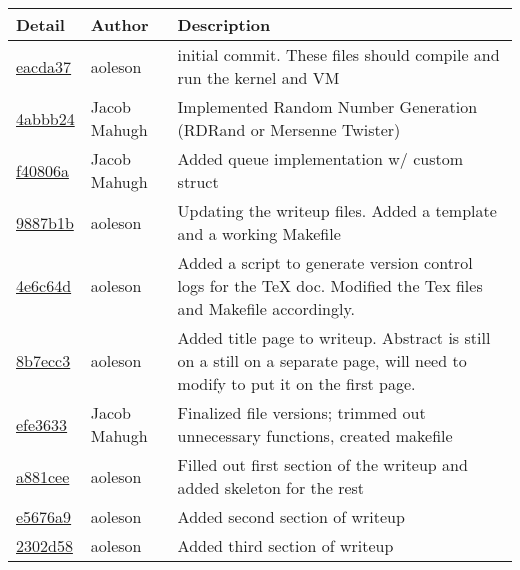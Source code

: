 \begin{tabular}{l l l}\textbf{Detail} & \textbf{Author} & \textbf{Description}\\\hline
\href{git@github.com:aoleson/cs444/commit/eacda375043af0c890654149a289a781c0d558cf}{eacda37} & aoleson & initial commit. These files should compile and run the kernel and VM\\\hline
\href{git@github.com:aoleson/cs444/commit/4abbb240a90bdba422c608f9917f45b501decaac}{4abbb24} & Jacob Mahugh & Implemented Random Number Generation (RDRand or Mersenne Twister)\\\hline
\href{git@github.com:aoleson/cs444/commit/f40806a12aac697608b0364de9c29d803cbb688f}{f40806a} & Jacob Mahugh & Added queue implementation w/ custom struct\\\hline
\href{git@github.com:aoleson/cs444/commit/9887b1bce65d52ad32789073e14cdbdf505287cb}{9887b1b} & aoleson & Updating the writeup files. Added a template and a working Makefile\\\hline
\href{git@github.com:aoleson/cs444/commit/4e6c64d648c1ebccc697c451c50de5077be7ca20}{4e6c64d} & aoleson & Added a script to generate version control logs for the TeX doc. Modified the Tex files and Makefile accordingly.\\\hline
\href{git@github.com:aoleson/cs444/commit/8b7ecc3f64e5c56b29ca5f6f38a7992d4476c72c}{8b7ecc3} & aoleson & Added title page to writeup. Abstract is still on a still on a separate page, will need to modify to put it on the first page.\\\hline
\href{git@github.com:aoleson/cs444/commit/efe3633ebe7f21d53cfa58ea1648db660104e052}{efe3633} & Jacob Mahugh & Finalized file versions; trimmed out unnecessary functions, created makefile\\\hline
\href{git@github.com:aoleson/cs444/commit/a881cee4d8422c40bff2419b07f2f16a1456b713}{a881cee} & aoleson & Filled out first section of the writeup and added skeleton for the rest\\\hline
\href{git@github.com:aoleson/cs444/commit/e5676a9bdf5e22732146b240935abaa426459cfb}{e5676a9} & aoleson & Added second section of writeup\\\hline
\href{git@github.com:aoleson/cs444/commit/2302d58153455c6b6d444f4b20aceac4f336a5e5}{2302d58} & aoleson & Added third section of writeup\\\hline\end{tabular}
